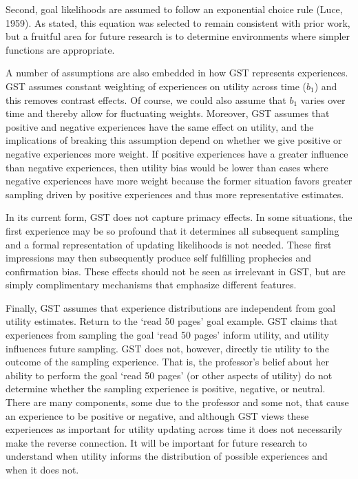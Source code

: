\documentclass[english,,man]{apa6}
\theoremstyle{definition}
\theoremstyle{definition}
\theoremstyle{definition}
\theoremstyle{remark}
\begin{document}
Second, goal likelihoods are assumed to follow an exponential choice
rule (Luce, 1959). As stated, this equation was selected to remain
consistent with prior work, but a fruitful area for future research is
to determine environments where simpler functions are appropriate.

A number of assumptions are also embedded in how GST represents
experiences. GST assumes constant weighting of experiences on utility
across time (\(b_1\)) and this removes contrast effects. Of course, we
could also assume that \(b_1\) varies over time and thereby allow for
fluctuating weights. Moreover, GST assumes that positive and negative
experiences have the same effect on utility, and the implications of
breaking this assumption depend on whether we give positive or negative
experiences more weight. If positive experiences have a greater
influence than negative experiences, then utility bias would be lower
than cases where negative experiences have more weight because the
former situation favors greater sampling driven by positive experiences
and thus more representative estimates.

In its current form, GST does not capture primacy effects. In some
situations, the first experience may be so profound that it determines
all subsequent sampling and a formal representation of updating
likelihoods is not needed. These first impressions may then subsequently
produce self fulfilling prophecies and confirmation bias. These effects
should not be seen as irrelevant in GST, but are simply complimentary
mechanisms that emphasize different features.

Finally, GST assumes that experience distributions are independent from
goal utility estimates. Return to the `read 50 pages' goal example. GST
claims that experiences from sampling the goal `read 50 pages' inform
utility, and utility influences future sampling. GST does not, however,
directly tie utility to the outcome of the sampling experience. That is,
the professor's belief about her ability to perform the goal `read 50
pages' (or other aspects of utility) do not determine whether the
sampling experience is positive, negative, or neutral. There are many
components, some due to the professor and some not, that cause an
experience to be positive or negative, and although GST views these
experiences as important for utility updating across time it does not
necessarily make the reverse connection. It will be important for future
research to understand when utility informs the distribution of possible
experiences and when it does not.
\end{document}
